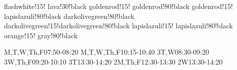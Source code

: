 \documentclass[landscape]{article}
\begin{document}
\pagestyle{fancy}
\chead{}
\CellHeight{0.75in}
\CellWidth{1.8in}
\TextSize{\centering\Large\bfseries}
\FiveDay
{}  {flashwhite!15!}    {lava!30!black}
 {goldenrod!15!}     {goldenrod!80!black}
 {goldenrod!15!}     {lapislazuli!80!black}
     {darkolivegreen!80!black}
 {darkolivegreen!15!}{darkolivegreen!80!black}
  {lapislazuli!15!}   {lapislazuli!80!black}
  {orange!15!}   {gray!80!black}

\begin{schedule}
    	  { }{M,T,W,Th,F}{07:50-08:20}
    	  { }{M,T,W,Th,F}{10:15-10:40}
    	  {3}{T,W}{08:30-09:20}
    	  {3}{W,Th,F}{09:20-10:10}
    	  {3}{T}{13:30-14:20}
    	  {2}{M,Th,F}{12:30-13:30}
    	  {2}{W}{13:30-14:20}
\end{schedule}
\end{document}
